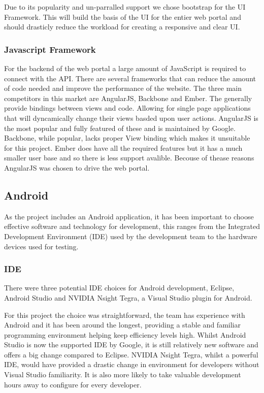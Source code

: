 \documentclass[11pt,a4paper]{article}
\begin{document}
Due to its popularity and un-parralled support we chose bootstrap for the UI Framework. This will build the basis of the UI for the entier web portal and should drasticly reduce the workload for creating a responsive and clear UI.

\subsubsection{Javascript Framework}
For the backend of the web portal a large amount of JavaScript is required to connect with the API. There are several frameworks that can reduce the amount of code needed and improve the performance of the website. The three main competitors in this market are AngularJS\cite{angular}, Backbone\cite{backbone} and Ember\cite{ember}. The generally provide bindings between views and code. Allowing for single page applications that will dyncamically change their views basded upon user actions. AngularJS is the most popular and fully featured of these and is maintained by Google. Backbone, while popular, lacks proper View binding which makes it unsuitable for this project. Ember does have all the required features but it has a much smaller user base and so there is less support avalible. Becouse of thease reasons AngularJS was chosen to drive the web portal. 

\subsection{Android}
As the project includes an Android application, it has been important to choose effective software and technology for development, this ranges from the Integrated Development Environment (IDE) used by the development team to the hardware devices used for testing.

\subsubsection{IDE}
There were three potential IDE choices for Android development, Eclipse, Android Studio and NVIDIA Nsight Tegra, a Visual Studio plugin for Android.

For this project the choice was straightforward, the team has experience with Android and it has been around the longest, providing a stable and familiar programming environment helping keep efficiency levels high. Whilst Android Studio is now the supported IDE by Google, it is still relatively new software and offers a big change compared to Eclipse. NVIDIA Nsight Tegra, whilst a powerful IDE, would have provided a drastic change in environment for developers without Visual Studio familiarity. It is also more likely to take valuable development hours away to configure for every developer.
\end{document}
